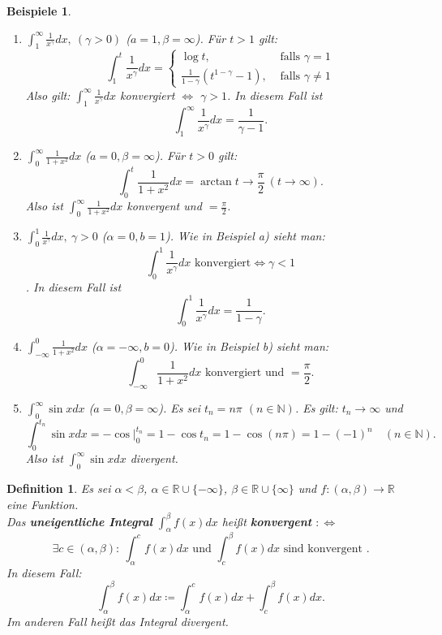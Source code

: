 \documentclass[12pt]{extreport} %
\newcommand{\N}{\mathbb{N}}
\newcommand{\R}{\mathbb{R}}
\theoremstyle{named}
\theoremstyle{itshape}
\newtheorem*{definition}{Definition}
\theoremstyle{normal}
\newtheorem*{beispiele}{Beispiele}
\begin{document}
{\begin{beispiele} ~\
	\begin{enumerate}
		\item $\int_{1}^{\infty} \frac{1}{x^{\gamma}} dx, ~(\gamma >0)$ ($a = 1, \beta = \infty$). Für $t > 1$ gilt: \label{11.0:bsp-obigeBspa}
			$$ \int_{1}^{t} \frac{1}{x^{\gamma}} dx = \begin{cases} \log t, & \text{ falls } \gamma = 1 \\ 
			\frac{1}{1 - \gamma} (t^{1 - \gamma} - 1), & \text{ falls } \gamma \neq 1 \end{cases} $$
			Also gilt: $\int_{1}^{\infty} \frac{1}{x^{\gamma}} dx$ konvergiert $\iff$ $\gamma > 1$. In diesem Fall ist
			$$ \int_{1}^{\infty} \frac{1}{x^{\gamma}} dx = \frac{1}{\gamma - 1}. $$
		\item $\int_{0}^{\infty} \frac{1}{1 + x^{2}} dx$ ($a = 0, \beta = \infty$). Für $t > 0$ gilt:
			$$ \int_{0}^{t} \frac{1}{1 + x^{2}} dx = \arctan t \rightarrow \frac{\pi}{2} ~(t \rightarrow \infty). $$ \label{11.0:bsp-obigeBspb}
			Also ist $\int_{0}^{\infty} \frac{1}{1 + x^{2}} dx$ konvergent und $= \frac{\pi}{2}$.
		\item $\int_{0}^{1} \frac{1}{x^{\gamma}} dx, ~\gamma > 0$ ($\alpha = 0, b = 1$). Wie in Beispiel a) sieht man: \label{11.0:bsp-obigeBspc}
			$$ \int_{0}^{1} \frac{1}{x^{\gamma}} dx \text{ konvergiert} \iff \gamma < 1 $$.
			In diesem Fall ist \\
				$$ \int_{0}^{1} \frac{1}{x^{\gamma}} dx= \frac{1}{1-\gamma}. $$
		\item $\int_{-\infty}^{0} \frac{1}{1 + x^{2}} dx$ ($\alpha = -\infty, b = 0$). Wie in Beispiel b) sieht man: \label{11.0:bsp-obigeBspd}
			$$ \int_{-\infty}^{0} \frac{1}{1 + x^{2}} dx  \text{ konvergiert und } = \frac{\pi}{2}. $$
		\item $\int_{0}^{\infty} \sin x dx$  ($a = 0, \beta = \infty$). Es sei $t_{n} = n \pi$ $(n \in \N)$. Es gilt: $t_n \to \infty$ und \label{11.0:bsp-obigeBspe}
			$$ \int_{0}^{t_{n}} \sin x dx = -\cos \Big|_{0}^{t_{n}} = 1 - \cos t_{n} = 1 - \cos(n\pi) = 1 - (-1)^n \quad (n \in \N).$$
			Also ist $\int_{0}^{\infty} \sin x dx$ divergent.
	\end{enumerate}	
\end{beispiele}

\begin{definition}
	Es sei $\alpha < \beta$, $\alpha \in \R \cup \{ - \infty \}$, $\beta \in \R \cup \{ \infty \}$ und $f \colon (\alpha, \beta) \rightarrow \R$ eine Funktion. \\
	Das \textbf{uneigentliche Integral} $\int_{\alpha}^{\beta} f(x) dx$ hei{\ss}t \textbf{konvergent} $:\iff$ 
	$$\exists c \in (\alpha, \beta): ~ \int_{\alpha}^{c} f(x) dx \text{ und } \int_{c}^{\beta} f(x) dx \text{ sind konvergent }.$$ In diesem Fall:
	$$ \int_{\alpha}^{\beta} f(x) dx \coloneqq \int_{\alpha}^{c} f(x) dx + \int_{c}^{\beta} f(x) dx. $$
	Im anderen Fall hei{\ss}t das Integral divergent.
\end{definition}

}
\end{document}
